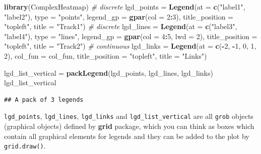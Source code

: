 \documentclass[]{book}
\newenvironment{Shaded}{\begin{snugshade}}{\end{snugshade}}
\newcommand{\KeywordTok}[1]{\textcolor[rgb]{0.13,0.29,0.53}{\textbf{#1}}}
\newcommand{\DataTypeTok}[1]{\textcolor[rgb]{0.13,0.29,0.53}{#1}}
\newcommand{\DecValTok}[1]{\textcolor[rgb]{0.00,0.00,0.81}{#1}}
\newcommand{\StringTok}[1]{\textcolor[rgb]{0.31,0.60,0.02}{#1}}
\newcommand{\CommentTok}[1]{\textcolor[rgb]{0.56,0.35,0.01}{\textit{#1}}}
\newcommand{\OperatorTok}[1]{\textcolor[rgb]{0.81,0.36,0.00}{\textbf{#1}}}
\newcommand{\NormalTok}[1]{#1}
\begin{document}
\begin{Shaded}
\begin{Highlighting}[]
\KeywordTok{library}\NormalTok{(ComplexHeatmap)}
\CommentTok{# discrete}
\NormalTok{lgd_points =}\StringTok{ }\KeywordTok{Legend}\NormalTok{(}\DataTypeTok{at =} \KeywordTok{c}\NormalTok{(}\StringTok{"label1"}\NormalTok{, }\StringTok{"label2"}\NormalTok{), }\DataTypeTok{type =} \StringTok{"points"}\NormalTok{, }
    \DataTypeTok{legend_gp =} \KeywordTok{gpar}\NormalTok{(}\DataTypeTok{col =} \DecValTok{2}\OperatorTok{:}\DecValTok{3}\NormalTok{), }\DataTypeTok{title_position =} \StringTok{"topleft"}\NormalTok{, }
    \DataTypeTok{title =} \StringTok{"Track1"}\NormalTok{)}
\CommentTok{# discrete}
\NormalTok{lgd_lines =}\StringTok{ }\KeywordTok{Legend}\NormalTok{(}\DataTypeTok{at =} \KeywordTok{c}\NormalTok{(}\StringTok{"label3"}\NormalTok{, }\StringTok{"label4"}\NormalTok{), }\DataTypeTok{type =} \StringTok{"lines"}\NormalTok{, }
    \DataTypeTok{legend_gp =} \KeywordTok{gpar}\NormalTok{(}\DataTypeTok{col =} \DecValTok{4}\OperatorTok{:}\DecValTok{5}\NormalTok{, }\DataTypeTok{lwd =} \DecValTok{2}\NormalTok{), }\DataTypeTok{title_position =} \StringTok{"topleft"}\NormalTok{, }
    \DataTypeTok{title =} \StringTok{"Track2"}\NormalTok{)}
\CommentTok{# continuous}
\NormalTok{lgd_links =}\StringTok{ }\KeywordTok{Legend}\NormalTok{(}\DataTypeTok{at =} \KeywordTok{c}\NormalTok{(}\OperatorTok{-}\DecValTok{2}\NormalTok{, }\OperatorTok{-}\DecValTok{1}\NormalTok{, }\DecValTok{0}\NormalTok{, }\DecValTok{1}\NormalTok{, }\DecValTok{2}\NormalTok{), }\DataTypeTok{col_fun =}\NormalTok{ col_fun, }
    \DataTypeTok{title_position =} \StringTok{"topleft"}\NormalTok{, }\DataTypeTok{title =} \StringTok{"Links"}\NormalTok{)}

\NormalTok{lgd_list_vertical =}\StringTok{ }\KeywordTok{packLegend}\NormalTok{(lgd_points, lgd_lines, lgd_links)}
\NormalTok{lgd_list_vertical}
\end{Highlighting}
\end{Shaded}

\begin{verbatim}
## A pack of 3 legends
\end{verbatim}

\texttt{lgd\_points}, \texttt{lgd\_lines}, \texttt{lgd\_links} and
\texttt{lgd\_list\_vertical} are all \texttt{grob} objects (graphical
objects) defined by \textbf{grid} package, which you can think as boxes
which contain all graphical elements for legends and they can be added
to the plot by \texttt{grid.draw()}.
\end{document}
